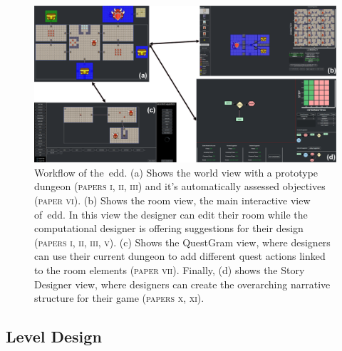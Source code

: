 \begin{figure}[t]
\centerline{\includegraphics[width=\textwidth]{figures/EDD-figs/eddworkflow.png}}
\caption{Workflow of the~\acrlong{edd}. (a) Shows the world view with a prototype dungeon (\textsc{papers i, ii, iii}) and it's automatically assessed objectives (\textsc{paper vi}). (b) Shows the room view, the main interactive view of~\acrshort{edd}. In this view the designer can edit their room while the computational designer is offering suggestions for their design (\textsc{papers i, ii, iii, v}). (c) Shows the QuestGram view, where designers can use their current dungeon to add different quest actions linked to the room elements (\textsc{paper vii}). Finally, (d) shows the Story Designer view, where designers can create the overarching narrative structure for their game (\textsc{papers x, xi}).} \label{fig:eddWorkflow}
\end{figure}






\subsection{Level Design}

